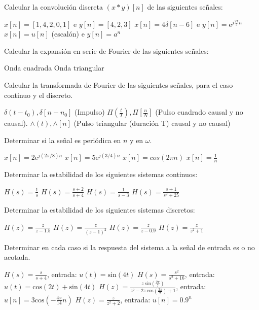 \documentclass[10pt,twoside,spanish,a4paper]{article}
\begin{document}
\begin{itemize}
		\itemP Calcular la convolución discreta $(x*y)[n]$ de las siguientes señales:
		\begin{itemize}
				\itemB $x[n]=[1,4,2,0,1]$ e $y[n]=[4,2,3]$
				\itemB $x[n]=4\delta[n-6]$ e $y[n]=\textrm{e}^{j\frac{2\pi}{5} n}$
				\itemB $x[n]=u[n]$ (escalón) e $y[n]=a^n$
		\end{itemize}
		
		\itemP Calcular la expansión en serie de Fourier de las siguientes señales:
		\begin{itemize}
				\itemB Onda cuadrada
				\itemB Onda triangular
		\end{itemize}
		
		\itemP Calcular la transformada de Fourier de las siguientes señales, para el caso continuo y el discreto.
		\begin{itemize}
				\itemB $\delta(t-t_0),\delta[n-n_0]$ (Impulso)
				\itemB $\Pi(\frac{t}{T}),\Pi[\frac{n}{N}]$ (Pulso cuadrado causal y no causal).
				\itemB $\wedge(t),\wedge[n]$ (Pulso triangular (duración T) causal y no causal)
		\end{itemize}
		
		\itemP Determinar si la señal es periódica en $n$ y en $\omega$.
			
		\begin{itemize}
				\itemB $x[n]=2\textrm{e}^{j(2\pi/8)n}$
				\itemB $x[n]=5\textrm{e}^{j(3/4)n}$
				\itemB $x[n]=cos(2\pi n)$
				\itemB $x[n]=\frac{1}{n}$
		\end{itemize}
		
		\itemP Determinar la estabilidad de los siguientes sistemas continuos:
		\begin{itemize}
				\itemB $H(s)=\frac{1}{s}$
				\itemB $H(s)=\frac{s+2}{s+4}$
				\itemB $H(s)=\frac{1}{s-3}$
				\itemB $H(s)=\frac{s+1}{s^2+25}$
		\end{itemize}
		
		\itemP Determinar la estabilidad de los siguientes sistemas discretos:
		\begin{itemize}
				\itemB $H(z)=\frac{z}{z-1.5}$
				\itemB $H(z)=\frac{z}{(z-1)^2}$
				\itemB $H(z)=\frac{z}{z-0.9}$
				\itemB $H(z)=\frac{z}{z^2+1}$
		\end{itemize}
		
		\itemP Determinar en cada caso si la respuesta del sistema a la señal de entrada es o no acotada.
		\begin{itemize}
				\itemB $H(s)=\frac{s}{s+4}$, entrada: $u(t)=\textrm{sin}(4t)$
				\itemB $H(s)=\frac{s^2}{s^2+16}$, entrada: $u(t)=\textrm{cos}(2t) + \textrm{sin}(4t)$
				\itemB $H(z)=\frac{z~\textrm{sin}(\frac{2\pi}{7})}{z^2-2z~\textrm{cos}(\frac{2\pi}{7})+1}$, entrada: $u[n]=3\textrm{cos}({-\frac{4\pi}{14}n})$
				\itemB $H(z)=\frac{z}{z^2+2}$, entrada: $u[n]=0.9^n$
		\end{itemize}
		

\end{itemize}
\end{document}

